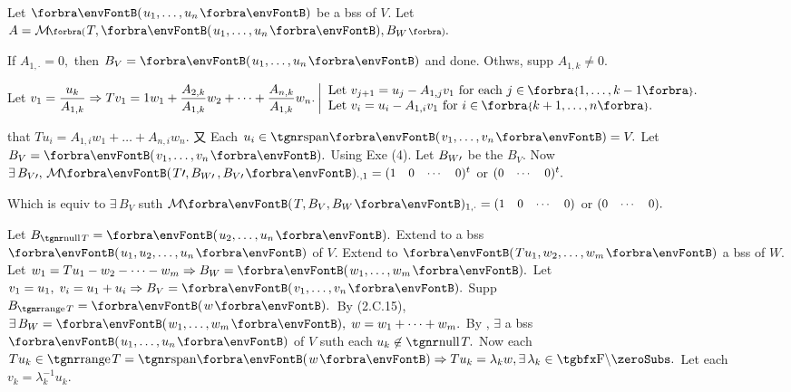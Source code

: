\par\quad
Let $\Par{u_1,\dots,u_n}$ be a bss of $V$. Let $A=\Mt[\BigPar]{T,\Par{u_1,\dots,u_n},B_W}.$\par\quad
If $A_{1,\cdot}=0,$ then $B_V=\Par{u_1,\dots,u_n}$ and done. Othws, supp $A_{1,k}\neq 0.$\par\quad
Let $v_1={\displaystyle{\frac{u_k}{A_{1,k}}}}\Rightarrow Tv_1=1w_1+{\displaystyle{\frac{A_{2,k}}{A_{1,k}}}}w_2+\dots+{\displaystyle{\frac{A_{n,k}}{A_{1,k}}}}w_n.$\;$\MathLeftMid{l}{$
	\!\!Let $v_{j+1}=u_{j}-A_{1,j}v_1$ for each $j\in\;\!\!\Bra{1,\dots,k-1}.\\$
	\!\!Let $v_i=u_i-A_{1,i} v_1$ for $i\in\;\!\!\Bra{k+1,\dots,n}.}$\vspace{4pt}\par\quad
\NOTICE that $Tu_i=A_{1,i}w_1+\dots+A_{n,i}w_n.$ 又 Each $u_i\in\Span{v_1,\dots,v_n}=V.$ Let $B_V=\Par{v_1,\dots,v_n}.$\PfEnd\vspace{6pt}\quad
\Or Using Exe (4). Let $B_{W\prime}$ be the $B_V.$ Now $\exists\,B_{V\apostrophe},\,\Mt{T\apostrophe,B_{W\apostrophe}\,,B_{V\apostrophe}}{_{\cdot,1}}={\small\begin{pmatrix}1&0&\cdots&0\end{pmatrix}}{^t}$ or ${\small\begin{pmatrix}0&\cdots&0\end{pmatrix}}{^t}.$\par\quad
Which is equiv to $\exists\,B_V$  suth $\Mt{T,B_V,B_W}{_{1,\cdot}}={\small\begin{pmatrix}1&0&\cdots&0\end{pmatrix}}$ or ${\small\begin{pmatrix}0&\cdots&0\end{pmatrix}}.$\PfEnd
\SepLine\pagebreak

Let $B_{\null T}=\Par{u_2,\dots,u_n}.$ Extend to a bss $\Par{u_1,u_2,\dots,u_n}$ of $V.$\parSol{}
Extend to $\Par{Tu_1,w_2,\dots,w_m}$ a bss of $W.$ Let $w_1=Tu_1-w_2-\dots-w_m\Rightarrow B_W=\Par{w_1,\dots,w_m}.$\parSol{}
Let \,$v_1=u_1,\;v_i=u_1+u_i\Rightarrow B_V=\Par{v_1,\dots,v_n}.$\PfEnd\vspace{3pt}\parSol{}
\Or Supp $B_{\range T}=\Par{w}.$ \,By {\NOTEFOR} (2.C.15), $\exists\,B_W=\Par{w_1,\dots,w_m},\;w=w_1+\dots+w_m.$\parSol{}
By , $\exists$ a bss $\Par{u_1,\dots,u_n}$ of $V$ suth each $u_k\not\in\null T.$\parSol{}
Now each $Tu_k\in\range T=\Span{w}\Rightarrow Tu_k=\lambda_k w,\exists\,\lambda_k\in\nonzeroFbb.$ Let each $v_k=\lambda_k^{-1}u_k.$\PfEnd
\SepLine

